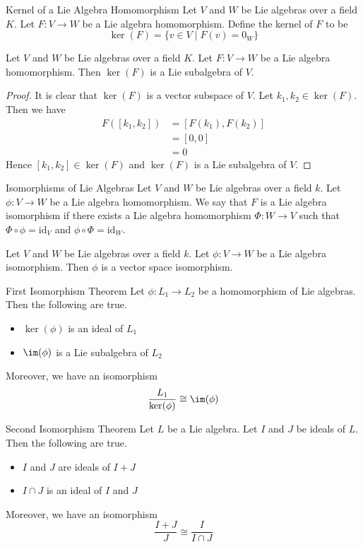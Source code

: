 \documentclass[a4paper]{article}
\begin{document}
\begin{defn}{Kernel of a Lie Algebra Homomorphism}{} Let $V$ and $W$ be Lie algebras over a field $K$. Let $F:V\to W$ be a Lie algebra homomorphism. Define the kernel of $F$ to be $$\ker(F)=\{v\in V\;|\;F(v)=0_W\}$$
\end{defn}

\begin{lmm}{}{} Let $V$ and $W$ be Lie algebras over a field $K$. Let $F:V\to W$ be a Lie algebra homomorphism. Then $\ker(F)$ is a Lie subalgebra of $V$. \tcbline
\begin{proof}
It is clear that $\ker(F)$ is a vector subspace of $V$. Let $k_1,k_2\in\ker(F)$. Then we have 
\begin{align*}
F([k_1,k_2])&=[F(k_1),F(k_2)]\tag{$F$ is a Lie algebra homomorphism}\\
&=[0,0]\\
&=0
\end{align*}
Hence $[k_1,k_2]\in\ker(F)$ and $\ker(F)$ is a Lie subalgebra of $V$. 
\end{proof}
\end{lmm}

\begin{defn}{Isomorphisms of Lie Algebras}{} Let $V$ and $W$ be Lie algebras over a field $k$. Let $\phi:V\to W$ be a Lie algebra homomorphism. We say that $F$ is a Lie algebra isomorphism if there exists a Lie algebra homomorphism $\Phi:W\to V$ such that $\Phi\circ\phi=\text{id}_V$ and $\phi\circ\Phi=\text{id}_W$. 
\end{defn}

\begin{prp}{}{} Let $V$ and $W$ be Lie algebras over a field $k$. Let $\phi:V\to W$ be a Lie algebra isomorphism. Then $\phi$ is a vector space isomorphism. 
\end{prp}

\begin{thm}{First Isomorphism Theorem}{} Let $\phi:L_1\to L_2$ be a homomorphism of Lie algebras. Then the following are true. 
\begin{itemize}
\item $\ker(\phi)$ is an ideal of $L_1$
\item $\im(\phi)$ is a Lie subalgebra of $L_2$
\end{itemize}
Moreover, we have an isomorphism $$\frac{L_1}{\ker(\phi)}\cong\im(\phi)$$
\end{thm}

\begin{thm}{Second Isomorphism Theorem}{} Let $L$ be a Lie algebra. Let $I$ and $J$ be ideals of $L$. Then the following are true. 
\begin{itemize}
\item $I$ and $J$ are ideals of $I+J$
\item $I\cap J$ is an ideal of $I$ and $J$
\end{itemize}
Moreover, we have an isomorphism $$\frac{I+J}{J}\cong\frac{I}{I\cap J}$$
\end{thm}
\end{document}
